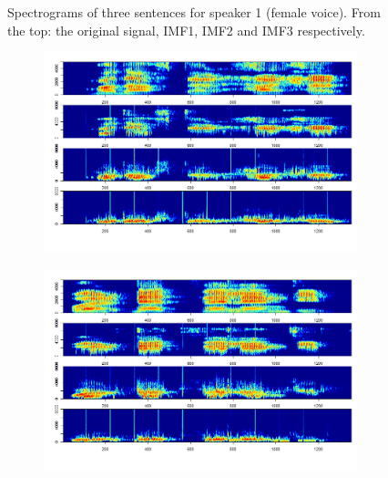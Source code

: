 \documentclass[11pt, a4paper]{article} %
\begin{document}
\begin{landscape}
\begin{figure}
\begin{subfigure}{0.8\textwidth}
  \label{fig:sfig2}
\end{subfigure}
\label{fig1}
\caption{Spectrograms of three sentences for speaker 1 (female voice). From the top: the original signal, IMF1, IMF2 and IMF3 respectively.}
\end{figure}
\end{landscape}


\begin{landscape}
\begin{figure}
\begin{subfigure}{0.8\textwidth}
  \centering
  \includegraphics[width=\linewidth]{spectro_speak3.png}
  \label{fig:sfig1}
\end{subfigure}%
\begin{subfigure}{0.8\textwidth}
  \centering
  \includegraphics[width=\linewidth]{spectro_speak3_bis.png}
  \label{fig:sfig2}
\end{subfigure}\\

\end{figure}
\end{landscape}
\end{document}

